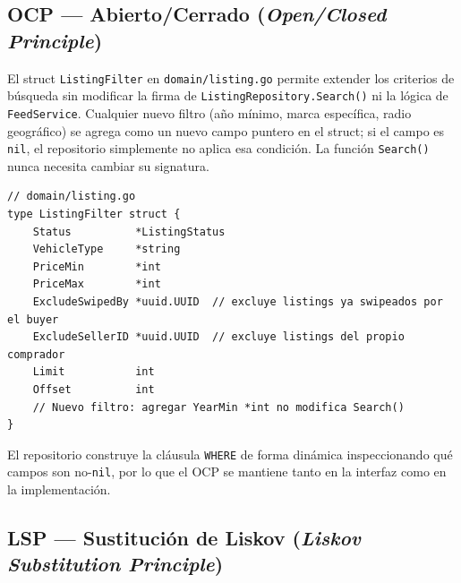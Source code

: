 \documentclass[12pt,a4paper]{article}
\begin{document}
\begin{center}
\end{center}

\subsection{OCP --- Abierto/Cerrado (\textit{Open/Closed Principle})}

El struct \texttt{ListingFilter} en \texttt{domain/listing.go} permite extender los criterios de
búsqueda sin modificar la firma de \texttt{ListingRepository.Search()} ni la lógica de
\texttt{FeedService}. Cualquier nuevo filtro (año mínimo, marca específica, radio geográfico)
se agrega como un nuevo campo puntero en el struct; si el campo es \texttt{nil}, el repositorio
simplemente no aplica esa condición. La función \texttt{Search()} nunca necesita cambiar su
signatura.
\begin{lstlisting}[style=gostyle]
// domain/listing.go
type ListingFilter struct {
    Status          *ListingStatus
    VehicleType     *string
    PriceMin        *int
    PriceMax        *int
    ExcludeSwipedBy *uuid.UUID  // excluye listings ya swipeados por el buyer
    ExcludeSellerID *uuid.UUID  // excluye listings del propio comprador
    Limit           int
    Offset          int
    // Nuevo filtro: agregar YearMin *int no modifica Search()
}
\end{lstlisting}

El repositorio construye la cláusula \texttt{WHERE} de forma dinámica inspeccionando qué campos
son no-\texttt{nil}, por lo que el OCP se mantiene tanto en la interfaz como en la
implementación.
\subsection{LSP --- Sustitución de Liskov (\textit{Liskov Substitution Principle})}
\end{document}
